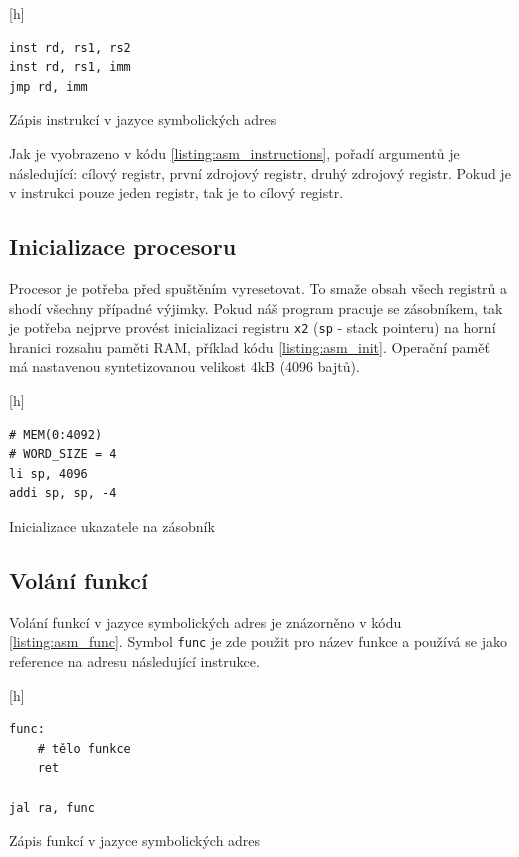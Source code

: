 \documentclass[FM,BP]{tulthesis}
\newenvironment{myquote}{\begin{list}{}{\setlength\leftmargin\parindent}\item[]}{\end{list}}
\newenvironment{listing}{\begin{myquote}\color{\tulcolor}}{\end{myquote}}
\begin{document}
\begin{listing}[h]
    \begin{verbatim}
inst rd, rs1, rs2
inst rd, rs1, imm
jmp rd, imm
    \end{verbatim}
    \caption{Zápis instrukcí v jazyce symbolických adres}
    \label{listing:asm_instructions}
\end{listing}

Jak je vyobrazeno v kódu \ref{listing:asm_instructions}, pořadí argumentů je následující: cílový registr, první zdrojový registr, druhý zdrojový registr. Pokud je v instrukci pouze jeden registr, tak je to cílový registr. 

\subsection{Inicializace procesoru}
Procesor je potřeba před spuštěním vyresetovat. To smaže obsah všech registrů a shodí všechny případné výjimky. Pokud náš program pracuje se zásobníkem, tak je potřeba nejprve provést inicializaci registru \verb|x2| (\verb|sp| - stack pointeru) na horní hranici rozsahu paměti RAM, příklad kódu \ref{listing:asm_init}. Operační paměť má nastavenou syntetizovanou velikost 4kB (4096 bajtů).

\begin{listing}[h]
    \begin{verbatim}
# MEM(0:4092)
# WORD_SIZE = 4
li sp, 4096
addi sp, sp, -4
    \end{verbatim}
    \caption{Inicializace ukazatele na zásobník}
    \label{listing:asm_init}
\end{listing}

\subsection{Volání funkcí}
Volání funkcí v jazyce symbolických adres je znázorněno v kódu \ref{listing:asm_func}. Symbol \verb|func| je zde použit pro název funkce a používá se jako reference na adresu následující instrukce.

\begin{listing}[h]
    \begin{verbatim}
func:
    # tělo funkce
    ret

jal ra, func
    \end{verbatim}
    \caption{Zápis funkcí v jazyce symbolických adres}
    \label{listing:asm_func}
\end{listing}
\end{document}
